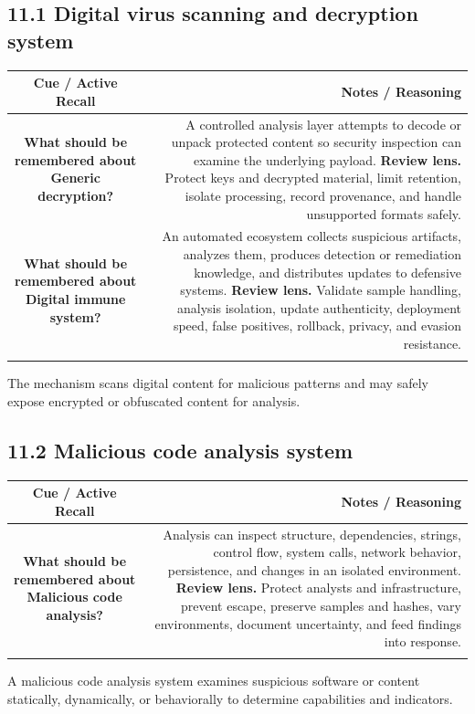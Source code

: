 \documentclass[11pt]{article}
\newcommand{\CornellHeader}{\rowcolor{Navy}\color{white}\bfseries Cue / Active Recall & \color{white}\bfseries Notes / Reasoning \\\endhead}
\newcommand{\CornellRow}[2]{\cellcolor{CueGray}\textbf{#1} & #2 \\\addlinespace[3pt]}
\begin{document}
\subsection{11.1 Digital virus scanning and decryption system}
\begin{longtable}{@{}C N@{}}
\CornellHeader
\CornellRow{What should be remembered about Generic decryption?}{A controlled analysis layer attempts to decode or unpack protected content so security inspection can examine the underlying payload. \textbf{Review lens.} Protect keys and decrypted material, limit retention, isolate processing, record provenance, and handle unsupported formats safely.}
\CornellRow{What should be remembered about Digital immune system?}{An automated ecosystem collects suspicious artifacts, analyzes them, produces detection or remediation knowledge, and distributes updates to defensive systems. \textbf{Review lens.} Validate sample handling, analysis isolation, update authenticity, deployment speed, false positives, rollback, privacy, and evasion resistance.}
\end{longtable}
\begin{sectionsummarybox}
The mechanism scans digital content for malicious patterns and may safely expose encrypted or obfuscated content for analysis.
\end{sectionsummarybox}
\subsection{11.2 Malicious code analysis system}
\begin{longtable}{@{}C N@{}}
\CornellHeader
\CornellRow{What should be remembered about Malicious code analysis?}{Analysis can inspect structure, dependencies, strings, control flow, system calls, network behavior, persistence, and changes in an isolated environment. \textbf{Review lens.} Protect analysts and infrastructure, prevent escape, preserve samples and hashes, vary environments, document uncertainty, and feed findings into response.}
\end{longtable}
\begin{sectionsummarybox}
A malicious code analysis system examines suspicious software or content statically, dynamically, or behaviorally to determine capabilities and indicators.
\end{sectionsummarybox}
\end{document}
